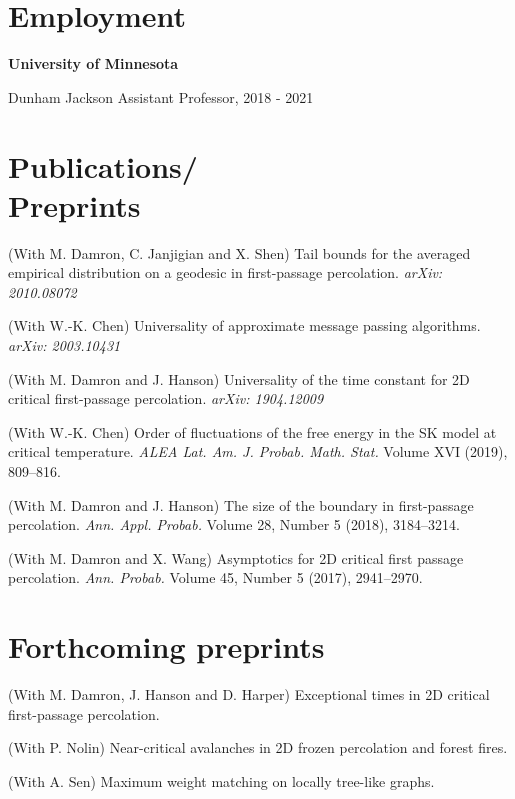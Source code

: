 \documentclass[margin,line,pifont,palatino,courier]{res}
\newenvironment{list1}{
  \begin{list}{\ding{113}}{%
      \setlength{\itemsep}{0in}
      \setlength{\parsep}{0in} \setlength{\parskip}{0in}
      \setlength{\topsep}{0in} \setlength{\partopsep}{0in}
      \setlength{\leftmargin}{0.17in}}}{\end{list}}
\begin{document}
\begin{resume}
\begin{list1}
\end{list1}


\section{\sc Employment}

{\bf University of Minnesota}\\
\vspace*{-.1in}
\begin{list1}
	\item[] Dunham Jackson Assistant Professor, 2018 - 2021 
\end{list1}

\section{\sc Publications/\\Preprints}
(With M. Damron, C. Janjigian and X. Shen) Tail bounds for the averaged empirical distribution on a geodesic in first-passage percolation. \textit{arXiv: 2010.08072}

(With W.-K. Chen) Universality of approximate message passing algorithms. \textit{arXiv: 2003.10431}

(With M. Damron and J. Hanson) Universality of the time constant for 2D critical first-passage percolation. \textit{arXiv: 1904.12009}

(With W.-K. Chen) Order of fluctuations of the free energy in the SK model at critical temperature. \textit{ALEA Lat. Am. J. Probab. Math. Stat.} Volume XVI (2019), 809--816.

(With M. Damron and J. Hanson) The size of the boundary in first-passage percolation. \textit{Ann. Appl. Probab.} Volume 28, Number 5 (2018), 3184--3214.

(With M. Damron and X. Wang) Asymptotics for 2D critical first passage percolation. \textit{Ann. Probab.} Volume 45, Number 5 (2017), 2941--2970.

\section{\sc Forthcoming preprints}
(With M. Damron, J. Hanson and D. Harper) Exceptional times in 2D critical first-passage percolation.

(With P. Nolin) Near-critical avalanches in 2D frozen percolation and forest fires.

(With A. Sen) Maximum weight matching on locally tree-like graphs.



\end{resume}
\end{document}
